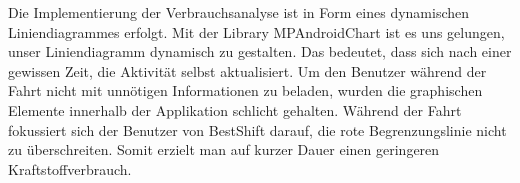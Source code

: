 Die Implementierung der Verbrauchsanalyse ist in Form eines dynamischen Liniendiagrammes erfolgt.
Mit der Library MPAndroidChart ist es uns gelungen, unser Liniendiagramm dynamisch zu gestalten.
Das bedeutet, dass sich nach einer gewissen Zeit, die Aktivität selbst aktualisiert.
Um den Benutzer während der Fahrt nicht mit unnötigen Informationen zu beladen, wurden die graphischen Elemente innerhalb der Applikation schlicht gehalten.\nextline
Während der Fahrt fokussiert sich der Benutzer von BestShift darauf, die rote Begrenzungslinie nicht zu überschreiten.
Somit erzielt man auf kurzer Dauer einen geringeren Kraftstoffverbrauch.


\clearpage %